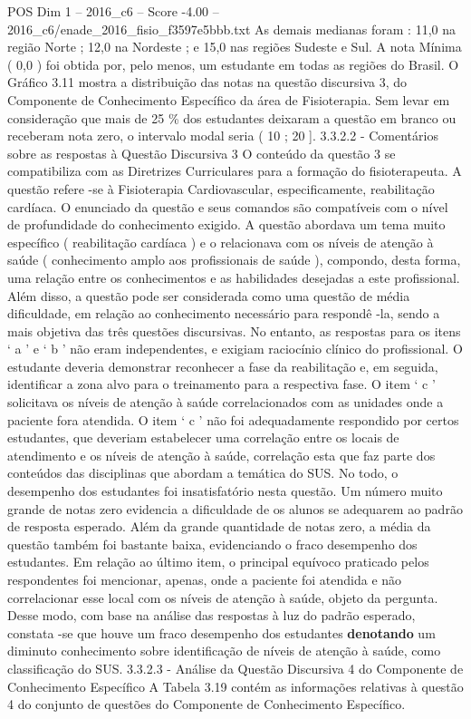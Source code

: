\begin{textsample}{POS Dim 1 – 2016\_c6 – Score -4.00 – 2016\_c6/enade\_2016\_fisio\_f3597e5bbb.txt}
As demais medianas foram : 11,0 na região Norte ; 12,0 na Nordeste ; e 15,0 nas regiões Sudeste e Sul.
A nota Mínima ( 0,0 ) foi obtida por, pelo menos, um estudante em todas as regiões do Brasil.
O Gráfico 3.11 mostra a distribuição das notas na questão discursiva 3, do Componente de Conhecimento Específico da área de Fisioterapia.
Sem levar em consideração que mais de 25 \% dos estudantes deixaram a questão em branco ou receberam nota zero, o intervalo modal seria ( 10 ; 20 ]. 3.3.2.2 - Comentários sobre as respostas à Questão Discursiva 3 O conteúdo da questão 3 se compatibiliza com as Diretrizes Curriculares para a formação do fisioterapeuta.
A questão refere -se à Fisioterapia Cardiovascular, especificamente, reabilitação cardíaca.
O enunciado da questão e seus comandos são compatíveis com o nível de profundidade do conhecimento exigido.
A questão abordava um tema muito específico ( reabilitação cardíaca ) e o relacionava com os níveis de atenção à saúde ( conhecimento amplo aos profissionais de saúde ), compondo, desta forma, uma relação entre os conhecimentos e as habilidades desejadas a este profissional.
Além disso, a questão pode ser considerada como uma questão de média dificuldade, em relação ao conhecimento necessário para respondê -la, sendo a mais objetiva das três questões discursivas.
No entanto, as respostas para os itens ‘ a ’ e ‘ b ’ não eram independentes, e exigiam raciocínio clínico do profissional.
O estudante deveria demonstrar reconhecer a fase da reabilitação e, em seguida, identificar a zona alvo para o treinamento para a respectiva fase.
O item ‘ c ’ solicitava os níveis de atenção à saúde correlacionados com as unidades onde a paciente fora atendida.
O item ‘ c ’ não foi adequadamente respondido por certos estudantes, que deveriam estabelecer uma correlação entre os locais de atendimento e os níveis de atenção à saúde, correlação esta que faz parte dos conteúdos das disciplinas que abordam a temática do SUS.
No todo, o desempenho dos estudantes foi insatisfatório nesta questão.
Um número muito grande de notas zero evidencia a dificuldade de os alunos se adequarem ao padrão de resposta esperado.
Além da grande quantidade de notas zero, a média da questão também foi bastante baixa, evidenciando o fraco desempenho dos estudantes.
Em relação ao último item, o principal equívoco praticado pelos respondentes foi mencionar, apenas, onde a paciente foi atendida e não correlacionar esse local com os níveis de atenção à saúde, objeto da pergunta.
Desse modo, com base na análise das respostas à luz do padrão esperado, constata -se que houve um fraco desempenho dos estudantes \textbf{denotando} um diminuto conhecimento sobre identificação de níveis de atenção à saúde, como classificação do SUS. 3.3.2.3 - Análise da Questão Discursiva 4 do Componente de Conhecimento Específico A Tabela 3.19 contém as informações relativas à questão 4 do conjunto de questões do Componente de Conhecimento Específico.

\end{textsample}
